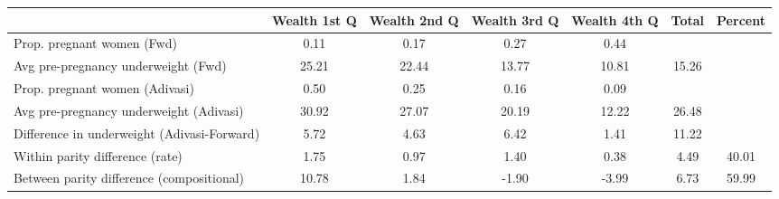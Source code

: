 \begin{tabular}{l*{6}{c}}
\toprule
            &\multicolumn{1}{c}{Wealth 1st Q}&\multicolumn{1}{c}{Wealth 2nd Q}&\multicolumn{1}{c}{Wealth 3rd Q}&\multicolumn{1}{c}{Wealth 4th Q}&\multicolumn{1}{c}{Total}&\multicolumn{1}{c}{Percent}\\
\midrule
\midrule
Prop. pregnant women (Fwd)&        0.11&        0.17&        0.27&        0.44&            &            \\
Avg pre-pregnancy underweight (Fwd)&       25.21&       22.44&       13.77&       10.81&       15.26&            \\
Prop. pregnant women (Adivasi)&        0.50&        0.25&        0.16&        0.09&            &            \\
Avg pre-pregnancy underweight (Adivasi)&       30.92&       27.07&       20.19&       12.22&       26.48&            \\
Difference in underweight (Adivasi-Forward)&        5.72&        4.63&        6.42&        1.41&       11.22&            \\
Within parity difference (rate)&        1.75&        0.97&        1.40&        0.38&        4.49&       40.01\\
Between parity difference (compositional)&       10.78&        1.84&       -1.90&       -3.99&        6.73&       59.99\\
\bottomrule
\end{tabular}
